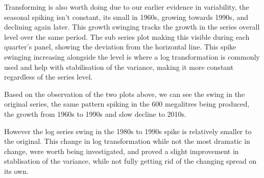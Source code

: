 \documentclass[
]{article}
\begin{document}
Transforming is also worth doing due to our earlier evidence in
variability, the seasonal spiking isn't constant, its small in 1960s,
growing towards 1990s, and declining again later. This growth swinging
tracks the growth in the series overall level over the same period. The
sub series plot making this visible during each quarter's panel, showing
the deviation from the horizontal line. This spike swinging increasing
alongside the level is where a log transformation is commonly used and
help with stabilisation of the variance, making it more constant
regardless of the series level.

Based on the observation of the two plots above, we can see the swing in
the original series, the same pattern spiking in the 600 megalitres
being produced, the growth from 1960s to 1990s and slow decline to
2010s.

However the log series swing in the 1980s to 1990s spike is relatively
smaller to the original. This change in log transformation while not the
most dramatic in change, were worth being investigated, and proved a
slight improvement in stablisation of the variance, while not fully
getting rid of the changing spread on its own.
\end{document}
